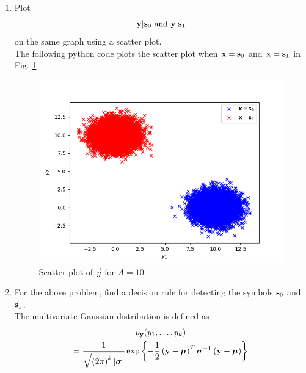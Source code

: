 \documentclass[10pt, a4paper]{article}
\providecommand{\brak}[1]{\ensuremath{\left(#1\right)}}
\begin{document}
    \begin{enumerate}
    \item
    Plot 
    \begin{equation}
    \mathbf{y}|\mathbf{s}_0 \text{ and } \mathbf{y}|\mathbf{s}_1
    \end{equation}
    on the same graph using a scatter plot.\\
    \solution The following python code plots the scatter plot when $\mathbf{x} = \mathbf{s}_0$ and $\mathbf{x} = \mathbf{s}_1$ in Fig. \ref{fig:scatter_plt_y}
\begin{center}
\end{center}
    \begin{figure}
    \centering
    \includegraphics[width=\columnwidth]{images/scatter_plot.png}
    \caption{Scatter plot of $\vec{y}$ for $A = 10$}
    \label{fig:scatter_plt_y}
    \end{figure}
    \item
    For the above problem, find a decision rule for detecting the symbols $\mathbf{s}_0 $ and $\mathbf{s}_1$.
    \\
  \solution 
The multivariate Gaussian distribution is defined as
%
\begin{multline}
\label{eq:multivariate}
p_{\mathbf{y}}(y_1,\dots,y_k)
\\
=\frac{1}{\sqrt{\brak{2\pi}^k\abs{\bm{\sigma}}}}\exp\cbrak{-\frac{1}{2}\brak{\mathbf{y}-\bm{\mu}}^T\bm{\sigma}^{-1}\brak{\mathbf{y}-\bm{\mu}}}
\end{multline}

\end{enumerate}
\end{document}

